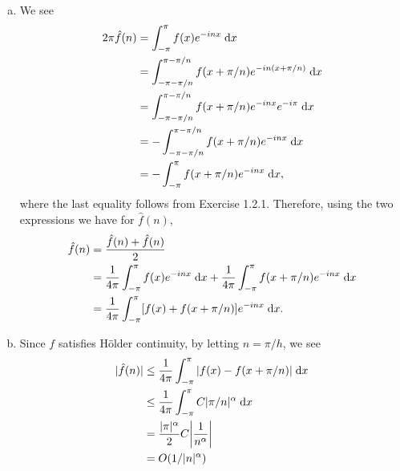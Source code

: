 \begin{exrc}[15]
\begin{soln}
    \begin{enumerate}[(a)]
    \item
        We see
        \begin{align*}
            2\pi \hat{f}(n)
            &= \int_{-\pi}^{\pi} f(x) e^{-inx} \;\mathrm d x \\
            &= \int_{-\pi - \pi / n}^{\pi - \pi / n} f(x + \pi / n) e^{-in(x + \pi / n)} \;\mathrm d x \\
            &= \int_{-\pi - \pi / n}^{\pi - \pi / n} f(x + \pi / n) e^{-inx} e^{-i\pi} \;\mathrm d x \\
            &= - \int_{-\pi - \pi / n}^{\pi - \pi / n} f(x + \pi / n) e^{-inx} \;\mathrm d x \\
            &= -\int_{-\pi}^{\pi} f(x + \pi / n) e^{-inx} \;\mathrm d x,
        \end{align*}
        where the last equality follows from Exercise 1.2.1.
        Therefore, using the two expressions we have for \(\hat{f}(n)\),
        \begin{align*}
            \hat{f}(n)
            &= \frac{\hat{f}(n) + \hat{f}(n)}{2} \\
            &= \frac{1}{4\pi} \int_{-\pi}^{\pi} f(x) e^{-inx} \;\mathrm d x
            + \frac{1}{4\pi} \int_{-\pi}^{\pi} f(x + \pi / n) e^{-inx} \;\mathrm d x \\
            &= \frac{1}{4\pi} \int_{-\pi}^{\pi} [f(x) + f(x + \pi / n)] e^{-inx} \;\mathrm d x.
        \end{align*}

    \item
        Since \(f\) satisfies Hölder continuity, by letting \(n = \pi / h\), we see
        \begin{align*}
            |\hat{f}(n)|
            & \leq \frac{1}{4\pi} \int_{-\pi}^{\pi} |f(x) - f(x + \pi / n)| \ud x \\
            & \leq \frac{1}{4\pi} \int_{-\pi}^{\pi} C |\pi / n|^\alpha \ud x \\
            &= \frac{|\pi|^\alpha}{2} C \abs{\frac{1}{n^\alpha}} \\
            &= O(1 / |n|^\alpha)
        \end{align*}
        

\end{enumerate}
\end{soln}
\end{exrc}
